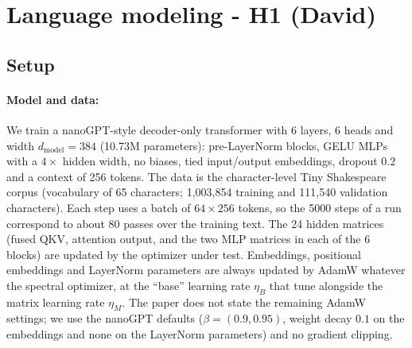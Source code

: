 
\section{Language modeling - H1 (David)}

\subsection{Setup}

\paragraph{Model and data:}
We train a nanoGPT-style decoder-only transformer with 6 layers, 6 heads and width $d_{\text{model}}=384$
(10.73M parameters): pre-LayerNorm blocks, GELU MLPs with a $4\times$ hidden width, no biases, tied input/output embeddings, dropout $0.2$ and a
context of 256 tokens. The data is the character-level Tiny Shakespeare corpus (vocabulary of 65 characters;
1{,}003{,}854 training and 111{,}540 validation characters). Each step uses a batch of $64\times256$ tokens, so the
5000 steps of a run correspond to about 80 passes over the training text. The 24 hidden matrices
(fused QKV, attention output, and the two MLP matrices in each of the 6 blocks) are updated by the optimizer under
test. Embeddings, positional embeddings and LayerNorm parameters are always updated by AdamW
whatever the spectral optimizer, at the ``base'' learning rate $\eta_B$ that \cite{shumaylov} tune alongside the matrix learning rate $\eta_M$.
The paper does not state the remaining AdamW settings; we use the nanoGPT defaults ($\beta=(0.9,0.95)$, weight decay $0.1$ on the embeddings and none on the LayerNorm parameters) and no gradient clipping.

